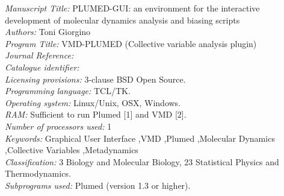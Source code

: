 \documentclass[preprint,12pt]{elsarticle}
\newcounter{bla}
\newcommand{\mytitle}{PLUMED-GUI: an environment for the interactive development 
  of molecular dynamics analysis and biasing scripts}
\newcommand{\mykeywords}{Graphical User Interface \sep VMD \sep Plumed \sep Molecular Dynamics \sep Collective Variables \sep Metadynamics}
\begin{document}
\begin{small}
\noindent
{\em Manuscript Title:}                                       
 \mytitle \\
{\em Authors:}                                                
 Toni Giorgino \\
{\em Program Title:}                                          
 VMD-PLUMED (Collective variable analysis plugin) \\
{\em Journal Reference:}                                      \\
{\em Catalogue identifier:}                                   \\
{\em Licensing provisions:}                                   
 3-clause BSD Open Source. \\
{\em Programming language:}                                   
 TCL/TK. \\
{\em Operating system:}                                       
 Linux/Unix, OSX, Windows. \\
{\em RAM:}                                               
 Sufficient to run Plumed [1] and VMD [2]. \\
{\em Number of processors used:}                              
 1 \\
{\em Keywords:} \mykeywords \\
{\em Classification:}                                         
  3 Biology and Molecular Biology, 23 Statistical Physics and Thermodynamics. \\
{\em Subprograms used:}                                       
  Plumed (version 1.3 or higher). \\

\end{small}
\end{document}
